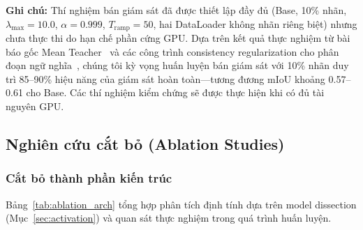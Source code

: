 \documentclass[conference]{IEEEtran}
\begin{document}
\begin{table}[t]
\centering
\caption{So sánh hiệu năng bán giám sát và giám sát hoàn toàn}
\label{tab:semi_results}
\end{table}

\noindent \textbf{Ghi chú:} Thí nghiệm bán giám sát đã được thiết lập đầy đủ (Base, 10\% nhãn, $\lambda_{\max}=10.0$, $\alpha=0.999$, $T_{\text{ramp}}=50$, hai DataLoader không nhãn riêng biệt) nhưng chưa thực thi do hạn chế phần cứng GPU. Dựa trên kết quả thực nghiệm từ bài báo gốc Mean Teacher~\cite{b4} và các công trình consistency regularization cho phân đoạn ngữ nghĩa~\cite{b11,b12}, chúng tôi kỳ vọng huấn luyện bán giám sát với 10\% nhãn duy trì 85--90\% hiệu năng của giám sát hoàn toàn---tương đương mIoU khoảng 0.57--0.61 cho Base. Các thí nghiệm kiểm chứng sẽ được thực hiện khi có đủ tài nguyên GPU.

\subsection{Nghiên cứu cắt bỏ (Ablation Studies)}
\label{sec:ablation}

\subsubsection{Cắt bỏ thành phần kiến trúc}

Bảng~\ref{tab:ablation_arch} tổng hợp phân tích định tính dựa trên model dissection (Mục~\ref{sec:activation}) và quan sát thực nghiệm trong quá trình huấn luyện.
\end{document}
